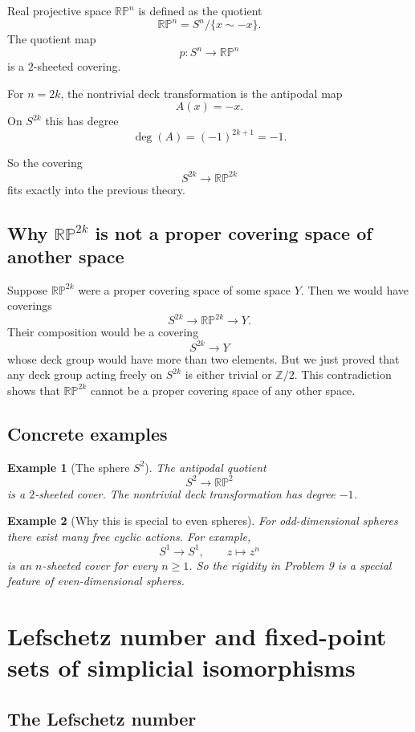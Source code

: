 \documentclass[12pt,a4paper]{article}
\newcommand{\Z}{\mathbb{Z}}
\newcommand{\RP}{\mathbb{RP}}
\newtheorem{example}{Example}
\theoremstyle{notespace}
\begin{document}
	Real projective space $\RP^n$ is defined as the quotient
	\[
	\RP^n=S^n/\{x\sim -x\}.
	\]
	The quotient map
	\[
	p:S^n\to \RP^n
	\]
	is a $2$-sheeted covering.
	
	For $n=2k$, the nontrivial deck transformation is the antipodal map
	\[
	A(x)=-x.
	\]
	On $S^{2k}$ this has degree
	\[
	\deg(A)=(-1)^{2k+1}=-1.
	\]
	
	So the covering
	\[
	S^{2k}\to \RP^{2k}
	\]
	fits exactly into the previous theory.
	
	\subsection{Why \texorpdfstring{$\RP^{2k}$}{RP2k} is not a proper covering space of another space}
	
	Suppose $\RP^{2k}$ were a proper covering space of some space $Y$. Then we would have coverings
	\[
	S^{2k}\to \RP^{2k}\to Y.
	\]
	Their composition would be a covering
	\[
	S^{2k}\to Y
	\]
	whose deck group would have more than two elements. But we just proved that any deck group acting freely on $S^{2k}$ is either trivial or $\Z/2$. This contradiction shows that $\RP^{2k}$ cannot be a proper covering space of any other space.
	
	\subsection{Concrete examples}
	
	\begin{example}[The sphere $S^2$]
		The antipodal quotient
		\[
		S^2\to \RP^2
		\]
		is a $2$-sheeted cover. The nontrivial deck transformation has degree $-1$.
	\end{example}
	
	\begin{example}[Why this is special to even spheres]
		For odd-dimensional spheres there exist many free cyclic actions. For example,
		\[
		S^1\to S^1,\qquad z\mapsto z^n
		\]
		is an $n$-sheeted cover for every $n\ge 1$.
		So the rigidity in Problem 9 is a special feature of even-dimensional spheres.
	\end{example}
	
	\section{Lefschetz number and fixed-point sets of simplicial isomorphisms}
	
	\subsection{The Lefschetz number}
	
\end{document}
